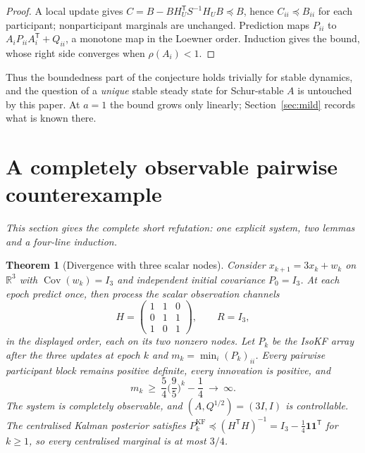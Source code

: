 \documentclass[11pt,a4paper]{article}
\numberwithin{equation}{section}
\newtheorem{theorem}{Theorem}[section]
\theoremstyle{remark}\newtheorem{remark}[theorem]{Remark}
\newcommand{\T}{^{\mathsf T}}
\newcommand{\one}{\mathbf 1}
\begin{document}
\begin{proof}
A local update gives $C=B-BH_U\T S^{-1}H_UB\preceq B$, hence $C_{ii}\preceq B_{ii}$ for each
participant; nonparticipant marginals are unchanged. Prediction maps $P_{ii}$ to
$A_iP_{ii}A_i\T+Q_{ii}$, a monotone map in the Loewner order. Induction gives the bound, whose
right side converges when $\rho(A_i)<1$.
\end{proof}

Thus the boundedness part of the conjecture holds trivially for stable dynamics, and the
question of a \emph{unique} stable steady state for Schur-stable $A$ is untouched by this paper.
At $a=1$ the bound grows only linearly; Section~\ref{sec:mild} records what is known there.

\section{A completely observable pairwise counterexample}\label{sec:counter}

\emph{This section gives the complete short refutation: one explicit system, two lemmas and a
four-line induction.}

\begin{theorem}[Divergence with three scalar nodes]\label{thm:main}
Consider $x_{k+1}=3x_k+w_k$ on $\mathbb R^3$ with $\operatorname{Cov}(w_k)=I_3$ and independent
initial covariance $P_0=I_3$. At each epoch predict once, then process the scalar observation
channels
\begin{equation}\label{eq:H}
H=\begin{pmatrix}1&1&0\\0&1&1\\1&0&1\end{pmatrix},\qquad R=I_3,
\end{equation}
in the displayed order, each on its two nonzero nodes. Let $P_k$ be the IsoKF array after the
three updates at epoch $k$ and $m_k=\min_i(P_k)_{ii}$. Every pairwise participant block remains
positive definite, every innovation is positive, and
\begin{equation}\label{eq:bound}
m_k\ \ge\ \frac54\Big(\frac95\Big)^k-\frac14\ \longrightarrow\ \infty .
\end{equation}
The system is completely observable, and $(A,Q^{1/2})=(3I,I)$ is controllable. The centralised
Kalman posterior satisfies $P_k^{\mathrm{KF}}\preceq(H\T H)^{-1}=I_3-\frac14\one\one\T$ for
$k\ge1$, so every centralised marginal is at most $3/4$.
\end{theorem}
\end{document}
